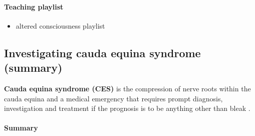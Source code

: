 \paragraph{Teaching playlist}

\begin{itemize}
	\item
	altered consciousness playlist
\end{itemize}

\subsection{Investigating cauda equina syndrome (summary)}

\textbf{Cauda equina syndrome (CES)} is the compression of nerve roots within the cauda equina and a medical emergency that requires prompt diagnosis, investigation and treatment if the prognosis is to be anything other than bleak .

\paragraph{Summary}

